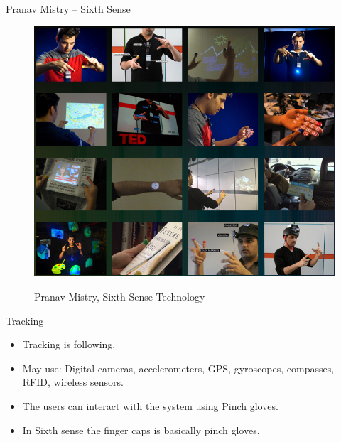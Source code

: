 \documentclass{beamer}
\begin{document}
\begin{frame}{Pranav Mistry – Sixth Sense}
	\begin{figure}
		\includegraphics[scale=.37]{sixthsense.png}\\
		\caption{Pranav Mistry, Sixth Sense Technology}
	\end{figure}
\end{frame}


\begin{frame}{Tracking}
	\begin{itemize}
		\item Tracking is following.
		\item May use: Digital cameras, accelerometers, GPS, gyroscopes, compasses, RFID, wireless sensors.
		\item The users can interact with the system using Pinch gloves.
		\item In Sixth sense the finger caps is basically pinch gloves.
	\end{itemize}
\end{frame}
\end{document}
